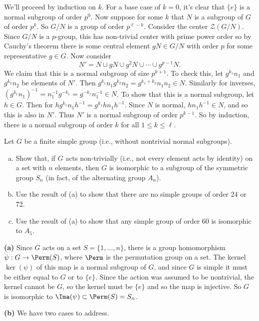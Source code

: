 \documentclass[11pt, letterpaper]{article}
\begin{document}
We'll proceed by induction on $k$. For a base case of $k=0$, it's clear that $\{e\}$ is a normal subgroup of order $p^0$. Now suppose for some $k$ that $N$ is a subgroup of $G$ of order $p^k$. So $G/N$ is a group of order $p^{\ell-k}$. Consider the center $\mathcal{Z}(G/N)$. Since $G/N$ is a $p$-group, this has non-trivial center with prime power order so by Cauchy's theorem there is some central element $gN\in G/N$ with order $p$ for some representative $g\in G$. Now consider 
\[
    N' = N\cup gN\cup g^2N\cup \cdots \cup g^{p-1}N
.\] 
We claim that this is a normal subgroup of size $p^{k+1}$. To check this, let $g^{k_1}n_1$ and $g^{k_2}n_2$ be elements of $N'$. Then $g^{k_1}n_1g^{k_2}n_2=g^{k_1+k_2}n_1n_2\in N$. Similarly for inverses, $(g^{k_1}n_1)^{-1}=n_1^{-1}g^{-k_1}=g^{-k_1}n_1^{-1}\in N$. To show that this is a normal subgroup, let $h\in G$. Then for $hg^{k_1}n_1h^{-1}=g^{k_1}hn_1h^{-1}$. Since $N$ is normal, $hn_1h^{-1}\in N$, and so this is also in $N'$. Thus $N'$ is a normal subgroup of order $p^{k-1}$. So by induction, there is a normal subgroup of order $k$ for all $1\leq k \le \ell$.
\pagebreak
\begin{problem}[10 points]
     Let $G$ be a finite simple group (i.e., without nontrivial normal subgroups).
     \begin{enumerate}[(a)] 
         \item Show that, if $G$ acts non-trivially (i.e., not every element acts by identity) on a set with $n$ elements, then $G$ is isomorphic to a subgroup of the symmetric group $S_n$ (in fact, of the alternating group $A_n$).
         \item Use the result of (a) to show that there are no simple groups of order 24 or 72. 
         \item Use the result of (a) to show that any simple group of order 60 is isomorphic to $A_5$. 
     \end{enumerate}
\end{problem}

\textbf{(a)} Since $G$ acts on a set $S=\{1,\ldots, n\}$, there is a group homomorphism $\psi : G \to \Perm(S)$, where $\Perm$ is the permutation group on a set. The kernel $\ker(\psi)$ of this map is a normal subgroup of $G$, and since $G$ is simple it must be either equal to $G$ or to $\{e\}$. Since the action was assumed to be nontrivial, the kernel cannot be $G$, so the kernel must be $\{e\}$ and so the map is injective. So $G$ is isomorphic to $\Ima(\psi)\subset \Perm(S)=S_n$.

\textbf{(b)} We have two cases to address.
\end{document}
